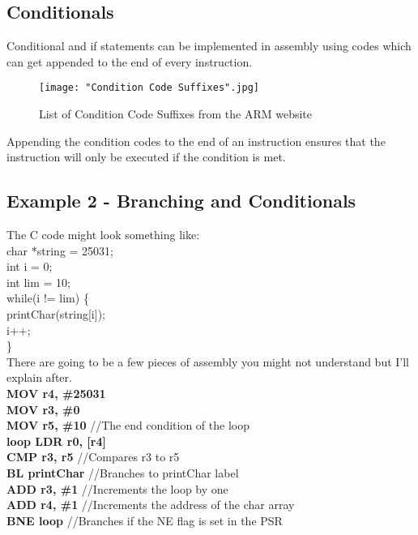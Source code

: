 \documentclass[10pt]{article}
\begin{document}
\subsection{Conditionals}
Conditional and if statements can be implemented in assembly using codes which can get appended to the end of every instruction. 
\begin{figure}[H]
\texttt{[image: "Condition Code Suffixes".jpg]}
\caption{List of Condition Code Suffixes from the ARM website}
\end{figure}

Appending the condition codes to the end of an instruction ensures that the instruction will only be executed if the condition is met.

\subsection{Example 2 - Branching and Conditionals}
The C code might look something like: \\
char *string = 25031; \\
int i = 0; \\
int lim = 10; \\
while(i != lim) \{ \\
\indent printChar(string[i]); \\
\indent i++; \\
\}	\\

There are going to be a few pieces of assembly you might not understand but I'll explain after. \\
\textbf{\indent \indent\indent MOV r4, \#25031} \\
\indent\indent\indent\textbf{MOV r3, \#0} \\
\indent\indent\indent\textbf{MOV r5, \#10} //The end condition of the loop\\
\textbf{loop    \indent    LDR r0, [r4]} \\
\indent\indent\indent\textbf{CMP r3, r5} //Compares r3 to r5\\
\indent\indent\indent\textbf{BL printChar} //Branches to printChar label \\
\indent\indent\indent\textbf{ADD r3, \#1} //Increments the loop by one \\
\indent\indent\indent\textbf{ADD r4, \#1} //Increments the address of the char array\\
\indent\indent\indent\textbf{BNE loop} //Branches if the NE flag is set in the PSR\\
\end{document}
